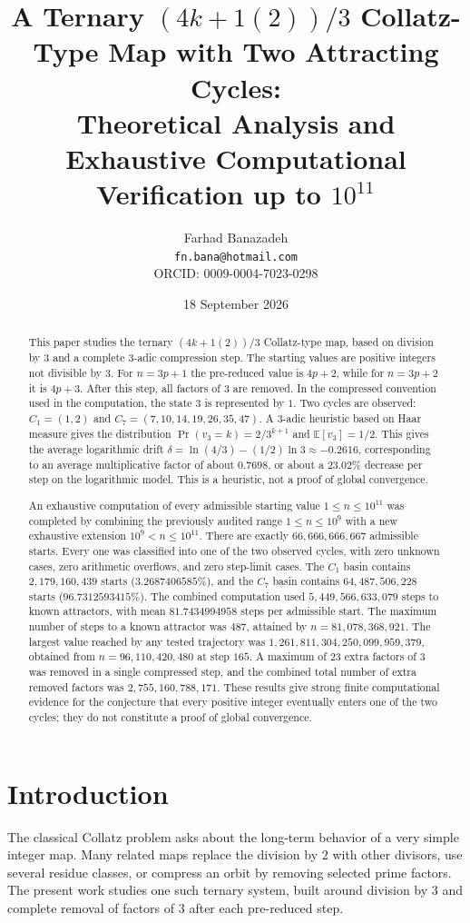 \documentclass[11pt]{article}
\title{A Ternary $(4k+1(2))/3$ Collatz-Type Map with Two Attracting Cycles:\\
Theoretical Analysis and Exhaustive Computational Verification up to $10^{11}$}
\author{Farhad Banazadeh\\\texttt{fn.bana@hotmail.com}\\ORCID: 0009-0004-7023-0298}
\date{18 September 2026}
\begin{document}
\maketitle

\begin{abstract}
This paper studies the ternary $(4k+1(2))/3$ Collatz-type map, based on division by $3$ and a complete $3$-adic compression step. The starting values are positive integers not divisible by $3$. For $n=3p+1$ the pre-reduced value is $4p+2$, while for $n=3p+2$ it is $4p+3$. After this step, all factors of $3$ are removed. In the compressed convention used in the computation, the state $3$ is represented by $1$. Two cycles are observed: $C_1=(1,2)$ and $C_7=(7,10,14,19,26,35,47)$. A $3$-adic heuristic based on Haar measure gives the distribution $\Pr(v_3=k)=2/3^{k+1}$ and $\mathbb{E}[v_3]=1/2$. This gives the average logarithmic drift
$\delta=\ln(4/3)-(1/2)\ln 3\approx-0.2616$, corresponding to an average multiplicative factor of about $0.7698$, or about a $23.02\%$ decrease per step on the logarithmic model. This is a heuristic, not a proof of global convergence.

An exhaustive computation of every admissible starting value $1\le n\le10^{11}$ was completed by combining the previously audited range $1\le n\le10^9$ with a new exhaustive extension $10^9<n\le10^{11}$. There are exactly $66,666,666,667$ admissible starts. Every one was classified into one of the two observed cycles, with zero unknown cases, zero arithmetic overflows, and zero step-limit cases. The $C_1$ basin contains $2,179,160,439$ starts ($3.2687406585\%$), and the $C_7$ basin contains $64,487,506,228$ starts ($96.7312593415\%$). The combined computation used $5,449,566,633,079$ steps to known attractors, with mean $81.7434994958$ steps per admissible start. The maximum number of steps to a known attractor was $487$, attained by $n=81,078,368,921$. The largest value reached by any tested trajectory was $1,261,811,304,250,099,959,379$, obtained from $n=96,110,420,480$ at step $165$. A maximum of $23$ extra factors of $3$ was removed in a single compressed step, and the combined total number of extra removed factors was $2,755,160,788,171$. These results give strong finite computational evidence for the conjecture that every positive integer eventually enters one of the two cycles; they do not constitute a proof of global convergence.
\end{abstract}

\section{Introduction}
The classical Collatz problem asks about the long-term behavior of a very simple integer map. Many related maps replace the division by $2$ with other divisors, use several residue classes, or compress an orbit by removing selected prime factors. The present work studies one such ternary system, built around division by $3$ and complete removal of factors of $3$ after each pre-reduced step.
\end{document}
